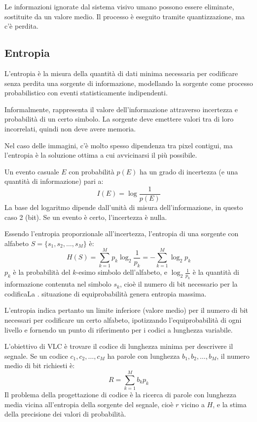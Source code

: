 Le informazioni ignorate dal sistema visivo umano possono essere eliminate, sostituite da un valore medio. Il processo è eseguito tramite quantizzazione, ma c'è perdita. 

\subsection{Entropia}
L'entropia è la misura della quantità di dati minima necessaria per codificare senza perdita una sorgente di informazione, modellando la sorgente come processo probabilistico con eventi statisticamente indipendenti.

Informalmente, rappresenta il valore dell'informazione attraverso incertezza e probabilità di un certo simbolo. La sorgente deve emettere valori tra di loro incorrelati, quindi non deve avere memoria. 

Nel caso delle immagini, c'è molto spesso dipendenza tra pixel contigui, ma l'entropia è la soluzione ottima a cui avvicinarsi il più possibile.

Un evento casuale $E$ con probabilità $p(E)$ ha un grado di incertezza (e una quantità di informazione) pari a:
$$I(E) = \log \frac{1}{p(E)}$$
La base del logaritmo dipende dall'unità di misura dell'informazione, in questo caso 2 (bit). Se un evento è certo, l'incertezza è nulla. 

Essendo l'entropia proporzionale all'incertezza, l'entropia di una sorgente con alfabeto $S = \{s_1, s_2, \dots,s_M\}$ è:
$$H(S) = \sum_{k=1}^{M} p_k \log_2 \frac{1}{p_k} = -\sum_{k=1}^{M}\log_2p_k$$
$p_k$ è la probabilità del $k$-esimo simbolo dell'alfabeto, e $\log_2\frac{1}{p_k}$ è la quantità di informazione contenuta nel simbolo $s_k$, cioè il numero di bit necessario per la codificaLa . situazione di equiprobabilità genera entropia massima.

L'entropia indica pertanto un limite inferiore (valore medio) per il numero di bit necessari per codificare un certo alfabeto, ipotizzando l'equiprobabilità di ogni livello e fornendo un punto di riferimento per i codici a lunghezza variabile. 

L'obiettivo di VLC è trovare il codice di lunghezza minima per descrivere il segnale. Se un codice $c_1, c_2, \dots, c_M$ ha parole con lunghezza $b_1, b_2, \dots, b_M$, il numero medio di bit richiesti è:
$$R = \sum_{k=1}^{M}b_kp_k$$
Il problema della progettazione di codice è la ricerca di parole con lunghezza media vicina all'entropia della sorgente del segnale, cioè $r$ vicino a $H$, e la stima della precisione dei valori di probabilità.

